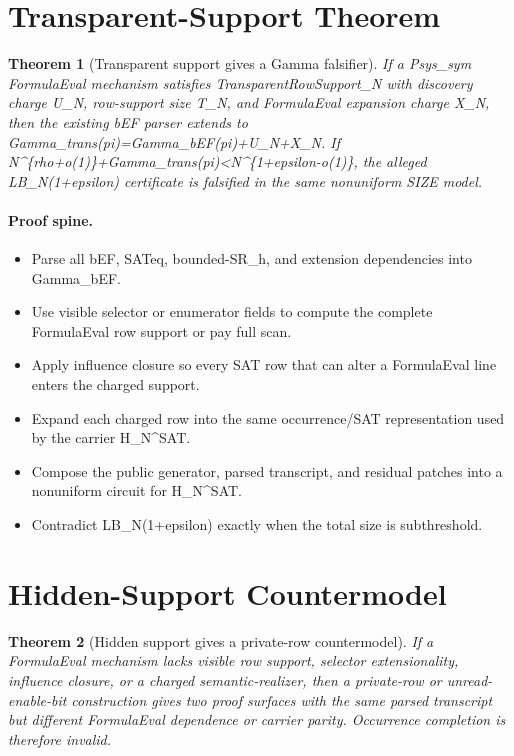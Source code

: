 \documentclass[11pt]{article}
\newtheorem{theorem}{Theorem}
\begin{document}
\section{Transparent-Support Theorem}
\begin{theorem}[Transparent support gives a Gamma falsifier]
If a Psys\_sym FormulaEval mechanism satisfies TransparentRowSupport\_N with discovery charge U\_N, row-support size T\_N, and FormulaEval expansion charge X\_N, then the existing bEF parser extends to Gamma\_trans(pi)=Gamma\_bEF(pi)+U\_N+X\_N. If N\textasciicircum{}\{rho+o(1)\}+Gamma\_trans(pi)<N\textasciicircum{}\{1+epsilon-o(1)\}, the alleged LB\_N(1+epsilon) certificate is falsified in the same nonuniform SIZE model.
\end{theorem}
\paragraph{Proof spine.}
\begin{itemize}
\item Parse all bEF, SATeq, bounded-SR\_h, and extension dependencies into Gamma\_bEF.
\item Use visible selector or enumerator fields to compute the complete FormulaEval row support or pay full scan.
\item Apply influence closure so every SAT row that can alter a FormulaEval line enters the charged support.
\item Expand each charged row into the same occurrence/SAT representation used by the carrier H\_N\textasciicircum{}SAT.
\item Compose the public generator, parsed transcript, and residual patches into a nonuniform circuit for H\_N\textasciicircum{}SAT.
\item Contradict LB\_N(1+epsilon) exactly when the total size is subthreshold.
\end{itemize}

\section{Hidden-Support Countermodel}
\begin{theorem}[Hidden support gives a private-row countermodel]
If a FormulaEval mechanism lacks visible row support, selector extensionality, influence closure, or a charged semantic-realizer, then a private-row or unread-enable-bit construction gives two proof surfaces with the same parsed transcript but different FormulaEval dependence or carrier parity. Occurrence completion is therefore invalid.
\end{theorem}
\end{document}
